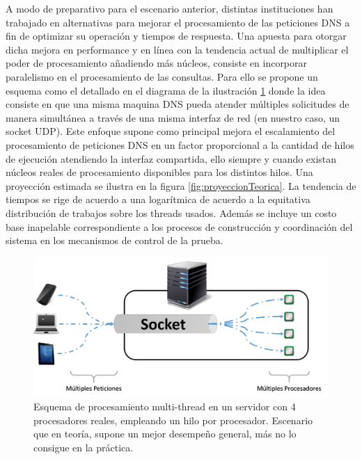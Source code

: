 A modo de preparativo para el escenario anterior, distintas instituciones han trabajado en alternativas para mejorar el procesamiento de las peticiones DNS a fin de optimizar su operación y tiempos de respuesta. Una apuesta para otorgar dicha mejora en performance y en línea con la tendencia actual de multiplicar el poder de procesamiento añadiendo más núcleos, consiste en incorporar paralelismo en el procesamiento de las consultas. Para ello se propone un esquema como el detallado en el diagrama de la ilustración \ref{fig:multi_thread} donde la idea consiste en que una misma maquina DNS pueda atender múltiples solicitudes de manera simultánea a través de una misma interfaz de red (en nuestro caso, un socket UDP). Este enfoque supone como principal mejora el escalamiento del procesamiento de peticiones DNS en un factor proporcional a la cantidad de hilos de ejecución atendiendo la interfaz compartida, ello siempre y cuando existan núcleos reales de procesamiento disponibles para los distintos hilos. Una proyección estimada se ilustra en la figura \ref{fig:proyeccionTeorica}. La tendencia de tiempos se rige de acuerdo a una logarítmica de acuerdo a la equitativa distribución de trabajos sobre los threads usados. Además se incluye un costo base inapelable correspondiente a los procesos de construcción y coordinación del sistema en los mecanismos de control de la prueba.

\begin{figure}[]
	\centering
	\includegraphics[scale=0.45]{imagenes/conf_multi_thread}
	\caption{Esquema de procesamiento multi-thread en un servidor con 4 procesadores reales, empleando un hilo por procesador. Escenario que en teoría, supone un mejor desempeño general, más no lo consigue en la práctica.}
	\label{fig:multi_thread}
\end{figure}

